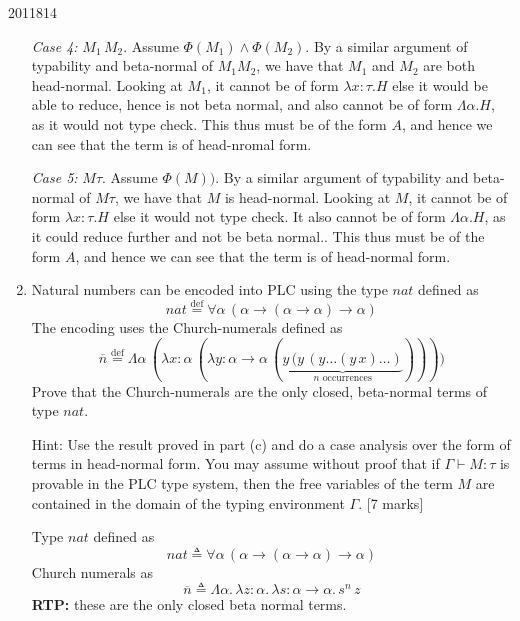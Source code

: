 \documentclass[10pt,\jkfside,a4paper]{article}
\newcommand{\answer}[1]{
    \begin{tcolorbox}[colframe=black, colback=white, sharp corners, boxrule=0.2mm, breakable]
        #1
    \end{tcolorbox}
}
\newcommand{\qmarks}[1]{\hspace*{\fill}[#1]}
\begin{document}
\begin{examquestion}{2011}{8}{14}
\begin{enumerate}
{                \textit{Case 4:} $M_1\,M_2$. Assume $\Phi(M_1) \wedge \Phi(M_2)$. By a similar argument of typability and beta-normal of $M_1 M_2$, we have that $M_1$ and $M_2$ are both head-normal. Looking at $M_1$, it cannot be of form $\lambda x: \tau. H$ else it would be able to reduce, hence is not beta normal, and also cannot be of form $\Lambda \alpha . H$, as it would not type check. This thus must be of the form $A$, and hence we can see that the term is of head-nromal form. 

                \textit{Case 5:} $M \tau$. Assume $\Phi(M))$. By a similar argument of typability and beta-normal of $M \tau$, we have that $M$ is head-normal. Looking at $M$, it cannot be of form $\lambda x: \tau. H$ else it would not type check. It also cannot be of form $\Lambda \alpha . H$, as it could reduce further and not be beta normal.. This thus must be of the form $A$, and hence we can see that the term is of head-normal form. 

            }

        \item
            Natural numbers can be encoded into PLC using the type $\mathit{nat}$ defined
            as
            \[
                \mathit{nat} \stackrel{\text{def}}{=} \forall \alpha\, (\alpha \to (\alpha \to \alpha) \to \alpha)
            \]
            The encoding uses the Church-numerals defined as
            \[
                \overline{n} \stackrel{\text{def}}{=} \Lambda \alpha\, (\lambda x : \alpha\, (\lambda y : \alpha \to \alpha\, (\underbrace{y\, (y\, (y \ldots (y\,x) \ldots)}_{n \text{ occurrences}}))))
            \]
            Prove that the Church-numerals are the only closed, beta-normal terms of type
            $\mathit{nat}$.

            Hint: Use the result proved in part (c) and do a case analysis over the form
            of terms in head-normal form. You may assume without proof that if
            $\Gamma \vdash M : \tau$ is provable in the PLC type system, then the free
            variables of the term $M$ are contained in the domain of the typing
            environment $\Gamma$. \qmarks{7 marks}

            \answer{
                Type $\mathit{nat}$ defined as
                \[
                    \mathit{nat} \triangleq \forall \alpha\, (\alpha \to (\alpha \to \alpha) \to \alpha)
                \]
                Church numerals as
                \[
                    \overline{n} \triangleq \Lambda \alpha.\, \lambda z : \alpha.\, \lambda s : \alpha \to \alpha.\, s^n\,z
                \]
                \textbf{RTP:} these are the only closed beta normal terms.

}
\end{enumerate}
\end{examquestion}
\end{document}
